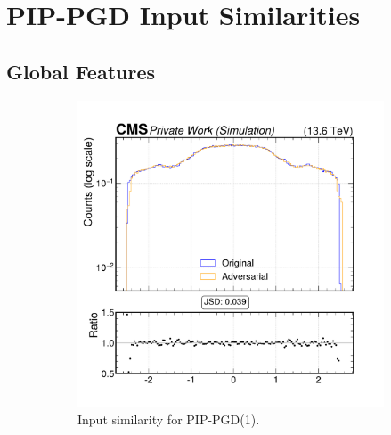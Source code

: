 \section{PIP-PGD Input Similarities}
\label{appendix:combined}

\subsection*{Global Features}


\begin{figure}[htbp]
  \centering
  \begin{subfigure}[t]{0.32\textwidth}
    \includegraphics[width=\linewidth]{media/output/features/compare/combined_it_1/cmp_global_features_jet_eta.pdf}
    \caption*{Input similarity for PIP-PGD(1).}
  \end{subfigure}\hfill
  \begin{subfigure}[t]{0.32\textwidth}

\end{subfigure}
\end{figure}
